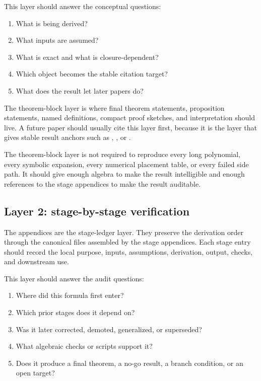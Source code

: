 This layer should answer the conceptual questions:
\begin{enumerate}[leftmargin=2.2em]
  \item What is being derived?
  \item What inputs are assumed?
  \item What is exact and what is closure-dependent?
  \item Which object becomes the stable citation target?
  \item What does the result let later papers do?
\end{enumerate}

The theorem-block layer is where final theorem statements, proposition statements, named definitions, compact proof sketches, and interpretation should live.  A future paper should usually cite this layer first, because it is the layer that gives stable result anchors such as , , or .

The theorem-block layer is not required to reproduce every long polynomial, every symbolic expansion, every numerical placement table, or every failed side path.  It should give enough algebra to make the result intelligible and enough references to the stage appendices to make the result auditable.

\subsection{Layer 2: stage-by-stage verification}
\label{subsec:stage-ledger-layer}

The appendices are the stage-ledger layer.  They preserve the derivation order
through the canonical  files assembled by
the stage appendices.  Each stage entry should record the local purpose,
inputs, assumptions, derivation, output, checks, and downstream use.

This layer should answer the audit questions:
\begin{enumerate}[leftmargin=2.2em]
  \item Where did this formula first enter?
  \item Which prior stages does it depend on?
  \item Was it later corrected, demoted, generalized, or superseded?
  \item What algebraic checks or scripts support it?
  \item Does it produce a final theorem, a no-go result, a branch condition, or an open target?
\end{enumerate}

